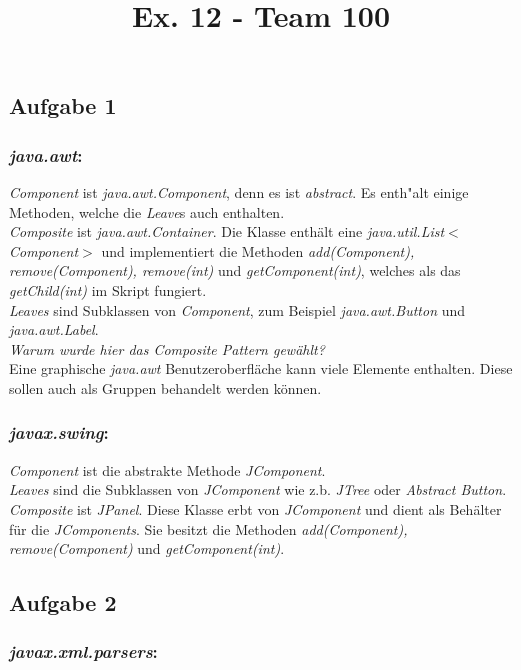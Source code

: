 \documentclass[a4paper]{article}
\title{Ex. 12 - Team 100}
\begin{document}
	\maketitle
\subsection*{Aufgabe 1}
\subsubsection*{\textit{java.awt}:}
\textit{Component} ist \textit{java.awt.Component}, denn es ist \textit{abstract}. Es enth"alt einige Methoden, welche die \textit{Leave}s auch enthalten. \\
\textit{Composite} ist \textit{java.awt.Container}. Die Klasse enthält eine \textit{java.util.List}$<$\textit{Component}$>$ und implementiert die 
Methoden \textit{add(Component), remove(Component), remove(int)} und \textit{getComponent(int)}, welches als das \textit{getChild(int)} im Skript fungiert. \\
\textit{Leaves} sind Subklassen von \textit{Component}, zum Beispiel \textit{java.awt.Button} und \textit{java.awt.Label}.\\
\emph{Warum wurde hier das \textit{Composite Pattern} gewählt?} \\
Eine graphische \textit{java.awt} Benutzeroberfläche kann viele Elemente enthalten. Diese sollen auch als Gruppen behandelt werden können.


\subsubsection*{\textit{javax.swing}:}
\textit{Component} ist die abstrakte Methode \textit{JComponent}. \\
\textit{Leaves} sind die Subklassen von \textit{JComponent} wie z.b. \textit{JTree} oder \textit{Abstract Button}. \\
\textit{Composite} ist \textit{JPanel}. Diese Klasse erbt von \textit{JComponent} und dient als Behälter für die \textit{JComponents}. Sie besitzt die Methoden
\textit{add(Component), remove(Component)} und \textit{getComponent(int)}.
\subsection*{Aufgabe 2}
	\subsubsection*{\textit{javax.xml.parsers}:}
	
\end{document}
